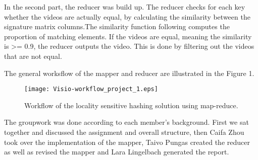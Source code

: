 \documentclass[a4paper, 11pt]{article}
\begin{document}
In the second part, the reducer was build up. The reducer checks for each key whether the videos are actually equal, by calculating the similarity between the signature matrix columns.The similarity function following computes the proportion  of matching elements. If the videos are equal, meaning the similarity is >= 0.9, the reducer outputs the video. This is done by filtering out the videos  that are not equal. 
 
The general worksflow of the mapper and reducer are illustrated in the Figure 1. 

\begin{figure}[!htb]
\centering
\texttt{[image: Visio-workflow\_project\_1.eps]}
\caption{Workflow of the locality sensitive hashing solution using map-reduce.}
\label{fig: Digraph}
\end{figure}

The groupwork was done according to each member's background. First we sat together and discussed the assignment and overall structure, then Caifa Zhou took over the implementation of the mapper, Taivo Pungas created the reducer as well as revised the mapper and Lara Lingelbach generated the report. 
\end{document}
